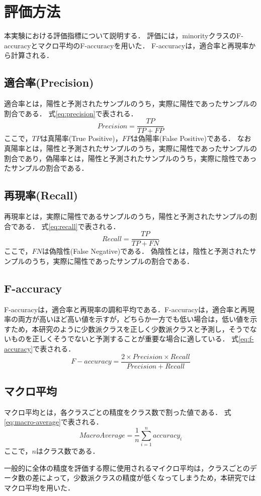 \section{評価方法}
\label{sec:evaluation}
本実験における評価指標について説明する．
評価には，minorityクラスのF-accuracyとマクロ平均のF-accuracyを用いた．
F-accuracyは，適合率と再現率から計算される．
\subsection{適合率(Precision)}
適合率とは，陽性と予測されたサンプルのうち，実際に陽性であったサンプルの割合である．
式\ref{eq:precision}で表される．
\begin{equation}
    \label{eq:precision}
    Precision = \frac{TP}{TP + FP}
\end{equation}
ここで，$TP$は真陽率(True Positive)，$FP$は偽陽率(False Positive)である．
なお真陽率とは，陽性と予測されたサンプルのうち，実際に陽性であったサンプルの割合であり，偽陽率とは，陽性と予測されたサンプルのうち，実際に陰性であったサンプルの割合である．

\subsection{再現率(Recall)}
再現率とは，実際に陽性であるサンプルのうち，陽性と予測されたサンプルの割合である．
式\ref{eq:recall}で表される．
\begin{equation}
    \label{eq:recall}
    Recall = \frac{TP}{TP + FN}
\end{equation}
ここで，$FN$は偽陰性(False Negative)である．
偽陰性とは，陰性と予測されたサンプルのうち，実際に陽性であったサンプルの割合である．

\subsection{F-accuracy}
F-accuracyは，適合率と再現率の調和平均である．F-accuracyは，適合率と再現率の両方が高いほど高い値を示すが，どちらか一方でも低い場合は，低い値を示すため，本研究のように少数派クラスを正しく少数派クラスと予測し，そうでないものを正しくそうでないと予測することが重要な場合に適している．
式\ref{eq:f-accuracy}で表される．
\begin{equation}
    \label{eq:f-accuracy}
    F-accuracy = \frac{2 \times Precision \times Recall}{Precision + Recall}
\end{equation}

\subsection{マクロ平均}
マクロ平均とは，各クラスごとの精度をクラス数で割った値である．
式\ref{eq:macro-average}で表される．
\begin{equation}
    \label{eq:macro-average}
    Macro Average = \frac{1}{n}\sum_{i=1}^{n}accuracy_i
\end{equation}
ここで，$n$はクラス数である．

一般的に全体の精度を評価する際に使用されるマイクロ平均は，クラスごとのデータ数の差によって，少数派クラスの精度が低くなってしまうため，本研究ではマクロ平均を用いた．
